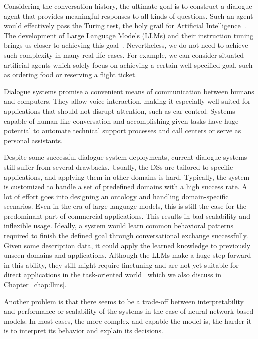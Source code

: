 Considering the conversation history, the ultimate goal is to construct a dialogue agent that provides meaningful responses to all kinds of questions.
Such an agent would effectively pass the Turing test, the holy grail for Artificial Intelligence~\cite{pinar2000turing}.
The development of Large Language Models (LLMs) and their instruction tuning brings us closer to achieving this goal~\cite{rothman2021transformers}.
Nevertheless, we do not need to achieve such complexity in many real-life cases.
For example, we can consider situated artificial agents which solely focus on achieving a certain well-specified goal, such as ordering food or reserving a flight ticket.

Dialogue systems promise a convenient means of communication between humans and computers.
They allow voice interaction, making it especially well suited for applications that should not disrupt attention, such as car control.
Systems capable of human-like conversation and accomplishing given tasks have huge potential to automate technical support processes and call centers or serve as personal assistants.

Despite some successful dialogue system deployments, current dialogue systems still suffer from several drawbacks.
Usually, the DSs are tailored to specific applications, and applying them in other domains is hard.
Typically, the system is customized to handle a set of predefined domains with a high success rate.
A lot of effort goes into designing an ontology and handling domain-specific scenarios.
Even in the era of large language models, this is still the case for the predominant part of commercial applications.
This results in bad scalability and inflexible usage.
Ideally, a system would learn common behavioral patterns required to finish the defined goal through conversational exchange successfully.
Given some description data, it could apply the learned knowledge to previously unseen domains and applications.
Although the LLMs make a huge step forward in this ability, they still might require finetuning and are not yet suitable for direct applications in the task-oriented world~\cite{iizuka2023clarifying,hudecek-dusek-2023-large} which we also discuss in Chapter~\ref{chap:llms}.

Another problem is that there seems to be a trade-off between interpretability and performance or scalability of the systems in the case of neural network-based models.
In most cases, the more complex and capable the model is, the harder it is to interpret its behavior and explain its decisions.

